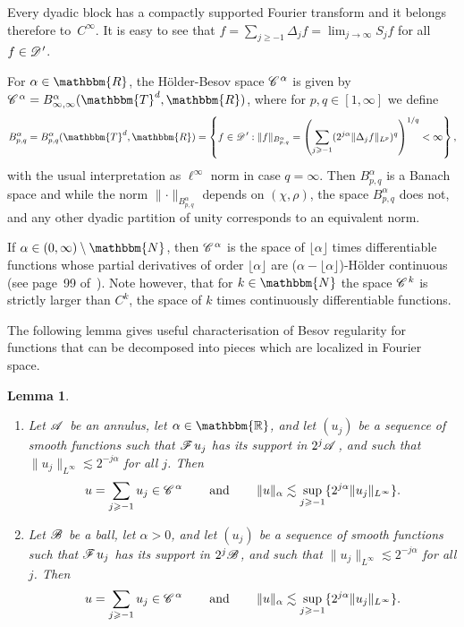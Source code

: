 \documentclass[11pt,reqno]{amsart}
\newcommand{\cdummy}{\cdot}
\newcommand{\tmdummy}{$\mbox{}$}
\newcommand{\tmop}[1]{\ensuremath{\operatorname{#1}}}
\newenvironment{enumeratenumeric}{\begin{enumerate}[1.] }{\end{enumerate}}
\newtheorem{lemma}[theorem]{Lemma}
\newcommand{\CC}{\mathscr{C} \hspace{.1em}}
\newcommand{\CD}{\mathscr{D} \hspace{.1em}}
\newcommand{\CF}{\mathscr{F} \hspace{.1em}}
\newcommand{\CB}{\mathscr{B} \hspace{.1em}}
\newcommand{\CA}{\mathscr{A} \hspace{.1em}}
\newcommand{\DD}{\mathscr{D} \hspace{.1em}}
\begin{document}
Every dyadic block has a compactly supported Fourier transform and it belongs
therefore to~$C^{\infty}$. It is easy to see that $f = \sum_{j \geqslant - 1}
\Delta_j f = \lim_{j \rightarrow \infty} S_j f$ for all $f \in \CD'$.

For $\alpha \in \mathbbm{R}$, the H{\"o}lder-Besov space $\CC^{\alpha}$ is
given by $\CC^{\alpha} = B^{\alpha}_{\infty, \infty} (\mathbbm{T}^d,
\mathbbm{R})$, where for $p, q \in [1, \infty]$ we define
\[ B^{\alpha}_{p, q} = B^{\alpha}_{p, q} (\mathbbm{T}^d, \mathbbm{R}) =
   \left\{ f \in \DD' : \|f\|_{B^{\alpha}_{p, q}} = \left( \sum_{j \geqslant -
   1} (2^{j \alpha} \| \Delta_j f\|_{L^p})^q \right)^{1 / q} < \infty
   \right\}, \]
with the usual interpretation as $\ell^{\infty}$ norm in case $q = \infty$.
Then $B^{\alpha}_{p, q}$ is a Banach space and while the norm $\lVert \cdummy
\rVert_{B^{\alpha}_{p, q}}$ depends on $(\chi, \rho)$, the space
$B^{\alpha}_{p, q}$ does not, and any other dyadic partition of unity
corresponds to an equivalent norm.

If $\alpha \in (0, \infty) \setminus \mathbbm{N}$, then $\CC^{\alpha}$ is the
space of $\lfloor \alpha \rfloor$ times differentiable functions whose partial
derivatives of order $\lfloor \alpha \rfloor$ are ($\alpha - \lfloor \alpha
\rfloor$)-H{\"o}lder continuous (see page~99
of~{\cite{bahouri_fourier_2011}}). Note however, that for $k \in \mathbbm{N}$
the space $\CC^k$ is strictly larger than $C^k$, the space of $k$ times
continuously differentiable functions.

The following lemma gives useful characterisation of Besov regularity for
functions that can be decomposed into pieces which are localized in Fourier
space.

\begin{lemma}
  \label{lem: Besov regularity of series}{\tmdummy}
  
  \begin{enumeratenumeric}
    \item Let $\CA$ be an annulus, let $\alpha \in \mathbb{\mathbbm{R}}$, and
    let $(u_j)$ be a sequence of smooth functions such that $\CF u_j$ has its
    support in $2^j \CA$, and such that $\|u_j \|_{L^{\infty}} \lesssim 2^{- j
    \alpha}$ for all $j$. Then
    \[ u = \sum_{j \geqslant - 1} u_j \in \CC^{\alpha} \qquad \tmop{and}
       \qquad \|u\|_{\alpha} \lesssim \sup_{j \geqslant - 1} \{2^{j \alpha}
       \|u_j \|_{L^{\infty}} \} . \]
    \item Let $\CB$ be a ball, let $\alpha > 0$, and let $(u_j)$ be a sequence
    of smooth functions such that $\CF u_j$ has its support in $2^j \CB$, and
    such that $\|u_j \|_{L^{\infty}} \lesssim 2^{- j \alpha}$ for all $j$.
    Then
    \[ u = \sum_{j \geqslant - 1} u_j \in \CC^{\alpha} \qquad \tmop{and}
       \qquad \|u\|_{\alpha} \lesssim \sup_{j \geqslant - 1} \{2^{j \alpha}
       \|u_j \|_{L^{\infty}} \} . \]
  \end{enumeratenumeric}
\end{lemma}
\end{document}
